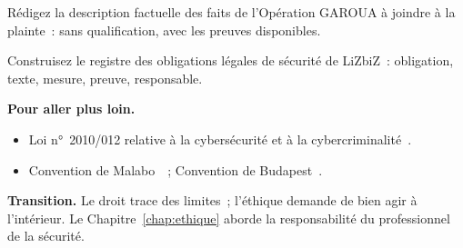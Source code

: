 \begin{boxexo}[title={\ding{45}\quad Exercice~11.9. Le dossier de plainte \niveauexpert}]
Rédigez la description factuelle des faits de l'Opération GAROUA à
joindre à la plainte~: sans qualification, avec les preuves disponibles.
\end{boxexo}

\begin{boxexo}[title={\ding{45}\quad Exercice~11.10. Le registre des obligations \niveauexpert}]
Construisez le registre des obligations légales de sécurité de LiZbiZ~:
obligation, texte, mesure, preuve, responsable.
\end{boxexo}

\bigskip

\begin{boxinfo}
\textbf{Pour aller plus loin.}
\begin{itemize}
    \item Loi n°~2010/012 relative à la cybersécurité et à la
          cybercriminalité~\cite{loi2010012}.
    \item Convention de Malabo~\cite{malabo2014}~; Convention de
          Budapest~\cite{budapest2001}.
\end{itemize}
\end{boxinfo}

\begin{boxinfo}
\textbf{Transition.} Le droit trace des limites~; l'éthique demande de
bien agir à l'intérieur. Le Chapitre~\ref{chap:ethique} aborde la
responsabilité du professionnel de la sécurité.
\end{boxinfo}
